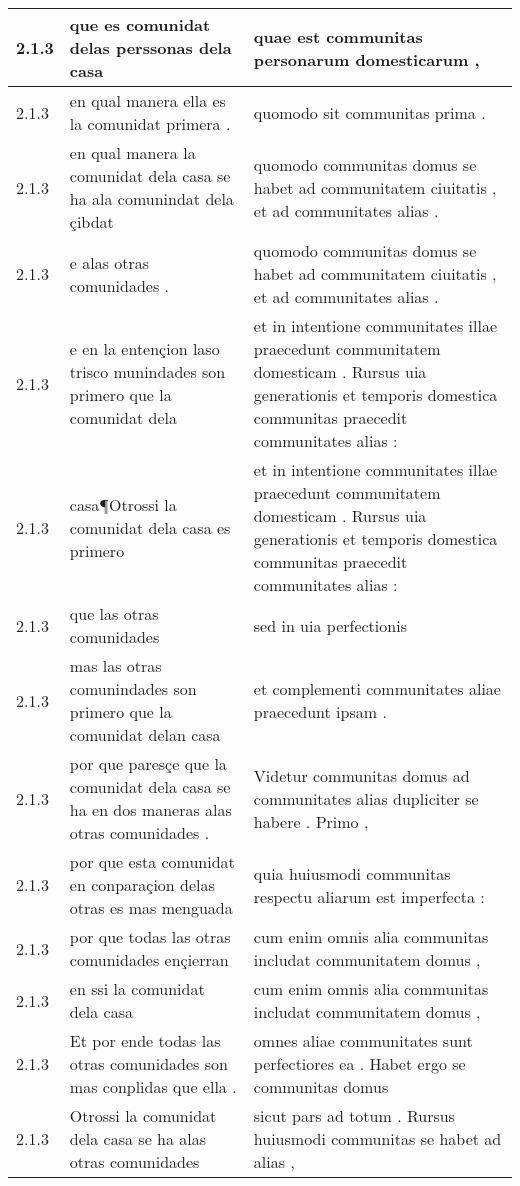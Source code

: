 \begin{tabular}{|p{1cm}|p{6.5cm}|p{6.5cm}|}
2.1.3 & que es comunidat delas perssonas dela casa & quae est communitas personarum domesticarum , \\\hline
2.1.3 & en qual manera ella es la comunidat primera . & quomodo sit communitas prima . \\\hline
2.1.3 & en qual manera la comunidat dela casa se ha ala comunindat dela çibdat & quomodo communitas domus se habet ad communitatem ciuitatis , et ad communitates alias . \\\hline
2.1.3 & e alas otras comunidades . & quomodo communitas domus se habet ad communitatem ciuitatis , et ad communitates alias . \\\hline
2.1.3 & e en la entençion laso trisco munindades son primero que la comunidat dela & et in intentione communitates illae praecedunt communitatem domesticam . Rursus uia generationis et temporis domestica communitas praecedit communitates alias : \\\hline
2.1.3 & casa¶Otrossi la comunidat dela casa es primero & et in intentione communitates illae praecedunt communitatem domesticam . Rursus uia generationis et temporis domestica communitas praecedit communitates alias : \\\hline
2.1.3 & que las otras comunidades & sed in uia perfectionis \\\hline
2.1.3 & mas las otras comunindades son primero que la comunidat delan casa & et complementi communitates aliae praecedunt ipsam . \\\hline
2.1.3 & por que paresçe que la comunidat dela casa se ha en dos maneras alas otras comunidades . & Videtur communitas domus ad communitates alias dupliciter se habere . Primo , \\\hline
2.1.3 & por que esta comunidat en conparaçion delas otras es mas menguada & quia huiusmodi communitas respectu aliarum est imperfecta : \\\hline
2.1.3 & por que todas las otras comunidades ençierran & cum enim omnis alia communitas includat communitatem domus , \\\hline
2.1.3 & en ssi la comunidat dela casa & cum enim omnis alia communitas includat communitatem domus , \\\hline
2.1.3 & Et por ende todas las otras comunidades son mas conplidas que ella . & omnes aliae communitates sunt perfectiores ea . Habet ergo se communitas domus \\\hline
2.1.3 & Otrossi la comunidat dela casa se ha alas otras comunidades & sicut pars ad totum . Rursus huiusmodi communitas se habet ad alias , \\\hline

\end{tabular}
